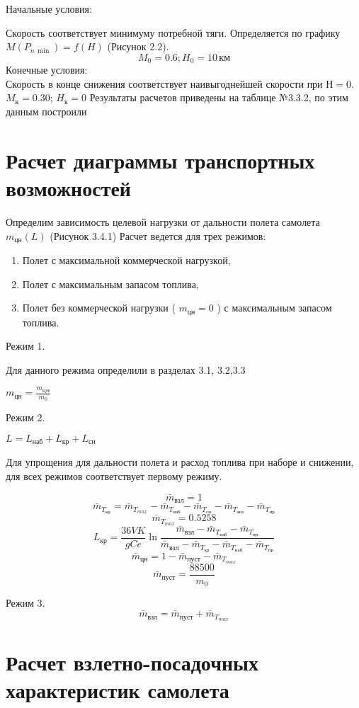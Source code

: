 Начальные условия:

Скорость соответствует минимуму потребной тяги. Определяется по графику
$M(P_{n\, \min})=f(H)$ (Рисунок 2.2).
\[
    M_0=0.6; H_0 = 10\, \text{км}
\]
Конечные условия:\\
Скорость в конце снижения соответствует наивыгоднейшей скорости при $Н=0$.
$M_к = 0.30$; $H_к = 0$
Результаты расчетов приведены на таблице №3.3.2, по этим данным построили


\section{Расчет диаграммы транспортных возможностей}
Определим зависимость целевой нагрузки от дальности полета самолета
$m_{цн}(L)$ (Рисунок 3.4.1)
Расчет ведется для трех режимов:
\begin{enumerate}
    \item Полет с максимальной коммерческой нагрузкой,
    \item Полет с максимальным запасом топлива,
    \item Полет без коммерческой нагрузки ( $m_{цн}=0$ ) с максимальным запасом топлива.
\end{enumerate}

Режим 1.

Для данного режима определили в разделах 3.1, 3.2,3.3

$m_{цн} = \frac{m_{ЦН}}{m_0}$

Режим 2.

$ L = L_{наб} + L_{кр} + L_{сн} $

Для упрощения для дальности полета и расход топлива при наборе и снижении,
для всех режимов соответствует первому режиму.

\[
    \bar{m}_{взл} = 1
\]
\[
    \bar{m}_{T_{кр}} = \bar{m}_{T_{max}}- \bar{m}_{T_{наб}} -
\bar{m}_{T_{сн}} - \bar{m}_{T_{анз}} - \bar{m}_{T_{пр}} 
\]
\[
\bar{m}_{T_{max}} = 0.5258
\]
\[
    L_{кр} = \frac{36 V K}{gCe} \ln{\frac{\bar{m}_{взл} - \bar{m}_{T_{наб}} - \bar{m}_{T_{пр}}}{\bar{m}_{взл}-\bar{m}_{T_{кр}}-\bar{m}_{T_{наб}} - \bar{m}_{T_{пр}}}}
\]
\[
    \bar{m}_{цн} = 1 - \bar{m}_{пуст} - \bar{m}_{T_{max}}
\]
\[
    \bar{m}_{пуст} = \frac{88500}{m_0}
\]

Режим 3.
\[
    \bar{m}_{взл} = \bar{m}_{пуст} + \bar{m}_{T_{max}}
\]

\section{Расчет взлетно-посадочных характеристик самолета}


